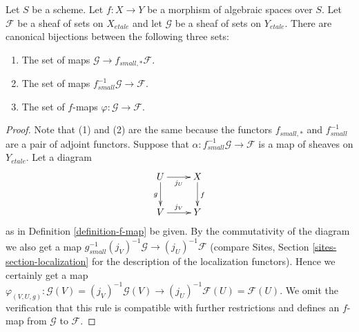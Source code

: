 \begin{lemma}
\label{lemma-f-map}
Let $S$ be a scheme.
Let $f : X \to Y$ be a morphism of algebraic spaces over $S$.
Let $\mathcal{F}$ be a sheaf of sets on $X_{etale}$ and
let $\mathcal{G}$ be a sheaf of sets on $Y_{etale}$.
There are canonical bijections between the following three sets:
\begin{enumerate}
\item The set of maps $\mathcal{G} \to f_{small, *}\mathcal{F}$.
\item The set of maps $f_{small}^{-1}\mathcal{G} \to \mathcal{F}$.
\item The set of $f$-maps $\varphi : \mathcal{G} \to \mathcal{F}$.
\end{enumerate}
\end{lemma}

\begin{proof}
Note that (1) and (2) are the same because the functors $f_{small, *}$
and $f_{small}^{-1}$ are a pair of adjoint functors.
Suppose that $\alpha : f_{small}^{-1}\mathcal{G} \to \mathcal{F}$
is a map of sheaves on $Y_{etale}$. Let a diagram
$$
\xymatrix{
U \ar[d]_g \ar[r]_{j_U} & X \ar[d]^f \\
V \ar[r]^{j_V} & Y
}
$$
as in Definition \ref{definition-f-map} be given.
By the commutativity of the diagram we also get a map
$g_{small}^{-1}(j_V)^{-1}\mathcal{G} \to (j_U)^{-1}\mathcal{F}$
(compare Sites, Section \ref{sites-section-localization} for the
description of the localization functors). Hence we certainly
get a map
$\varphi_{(V, U, g)} :
\mathcal{G}(V) = (j_V)^{-1}\mathcal{G}(V) 
\to
(j_U)^{-1}\mathcal{F}(U) = \mathcal{F}(U)$.
We omit the verification that this rule is compatible with
further restrictions and defines an $f$-map from $\mathcal{G}$ to
$\mathcal{F}$.


\end{proof}
